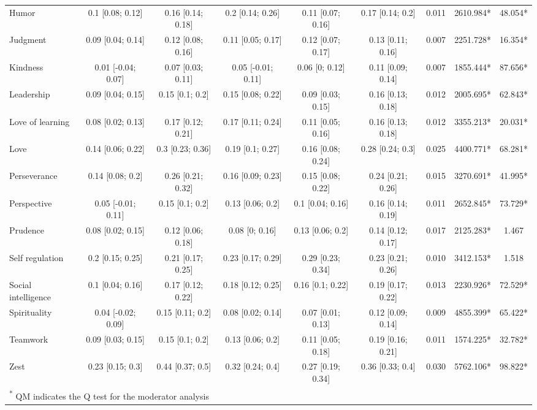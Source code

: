 \documentclass[
  man,floatsintext]{apa6}
\begin{document}
\begin{table}
{\begin{tabular}[t]{lcccccccc}
\addlinespace
Humor & 0.1 [0.08; 0.12] & 0.16 [0.14; 0.18] & 0.2 [0.14; 0.26] & 0.11 [0.07; 0.16] & 0.17 [0.14; 0.2] & 0.011 & 2610.984* & 48.054*\\
Judgment & 0.09 [0.04; 0.14] & 0.12 [0.08; 0.16] & 0.11 [0.05; 0.17] & 0.12 [0.07; 0.17] & 0.13 [0.11; 0.16] & 0.007 & 2251.728* & 16.354*\\
Kindness & 0.01 [-0.04; 0.07] & 0.07 [0.03; 0.11] & 0.05 [-0.01; 0.11] & 0.06 [0; 0.12] & 0.11 [0.09; 0.14] & 0.007 & 1855.444* & 87.656*\\
Leadership & 0.09 [0.04; 0.15] & 0.15 [0.1; 0.2] & 0.15 [0.08; 0.22] & 0.09 [0.03; 0.15] & 0.16 [0.13; 0.18] & 0.012 & 2005.695* & 62.843*\\
Love of learning & 0.08 [0.02; 0.13] & 0.17 [0.12; 0.21] & 0.17 [0.11; 0.24] & 0.11 [0.05; 0.16] & 0.16 [0.13; 0.18] & 0.012 & 3355.213* & 20.031*\\
\addlinespace
Love & 0.14 [0.06; 0.22] & 0.3 [0.23; 0.36] & 0.19 [0.1; 0.27] & 0.16 [0.08; 0.24] & 0.28 [0.24; 0.3] & 0.025 & 4400.771* & 68.281*\\
Perseverance & 0.14 [0.08; 0.2] & 0.26 [0.21; 0.32] & 0.16 [0.09; 0.23] & 0.15 [0.08; 0.22] & 0.24 [0.21; 0.26] & 0.015 & 3270.691* & 41.995*\\
Perspective & 0.05 [-0.01; 0.11] & 0.15 [0.1; 0.2] & 0.13 [0.06; 0.2] & 0.1 [0.04; 0.16] & 0.16 [0.14; 0.19] & 0.011 & 2652.845* & 73.729*\\
Prudence & 0.08 [0.02; 0.15] & 0.12 [0.06; 0.18] & 0.08 [0; 0.16] & 0.13 [0.06; 0.2] & 0.14 [0.12; 0.17] & 0.017 & 2125.283* & 1.467\\
Self regulation & 0.2 [0.15; 0.25] & 0.21 [0.17; 0.25] & 0.23 [0.17; 0.29] & 0.29 [0.23; 0.34] & 0.23 [0.21; 0.26] & 0.010 & 3412.153* & 1.518\\
\addlinespace
Social intelligence & 0.1 [0.04; 0.16] & 0.17 [0.12; 0.22] & 0.18 [0.12; 0.25] & 0.16 [0.1; 0.22] & 0.19 [0.17; 0.22] & 0.013 & 2230.926* & 72.529*\\
Spirituality & 0.04 [-0.02; 0.09] & 0.15 [0.11; 0.2] & 0.08 [0.02; 0.14] & 0.07 [0.01; 0.13] & 0.12 [0.09; 0.14] & 0.009 & 4855.399* & 65.422*\\
Teamwork & 0.09 [0.03; 0.15] & 0.15 [0.1; 0.2] & 0.13 [0.06; 0.2] & 0.11 [0.05; 0.18] & 0.19 [0.16; 0.21] & 0.011 & 1574.225* & 32.782*\\
Zest & 0.23 [0.15; 0.3] & 0.44 [0.37; 0.5] & 0.32 [0.24; 0.4] & 0.27 [0.19; 0.34] & 0.36 [0.33; 0.4] & 0.030 & 5762.106* & 98.822*\\
\bottomrule
\multicolumn{9}{l}{\textsuperscript{*} QM indicates the Q test for the moderator analysis}\\
\end{tabular}}
\end{table}
\end{document}
